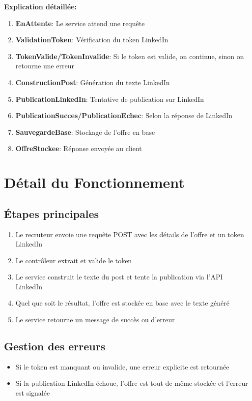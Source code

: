 \documentclass[a4paper,12pt]{report}
\begin{document}
\textbf{Explication détaillée:}
\begin{enumerate}[leftmargin=*]
    \item \textbf{EnAttente}: Le service attend une requête
    \item \textbf{ValidationToken}: Vérification du token LinkedIn
    \item \textbf{TokenValide/TokenInvalide}: Si le token est valide, on continue, sinon on retourne une erreur
    \item \textbf{ConstructionPost}: Génération du texte LinkedIn
    \item \textbf{PublicationLinkedIn}: Tentative de publication sur LinkedIn
    \item \textbf{PublicationSucces/PublicationEchec}: Selon la réponse de LinkedIn
    \item \textbf{SauvegardeBase}: Stockage de l'offre en base
    \item \textbf{OffreStockee}: Réponse envoyée au client
\end{enumerate}

\chapter{Détail du Fonctionnement}
\section{Étapes principales}
\begin{enumerate}[leftmargin=*]
    \item Le recruteur envoie une requête POST avec les détails de l'offre et un token LinkedIn
    \item Le contrôleur extrait et valide le token
    \item Le service construit le texte du post et tente la publication via l'API LinkedIn
    \item Quel que soit le résultat, l'offre est stockée en base avec le texte généré
    \item Le service retourne un message de succès ou d'erreur
\end{enumerate}

\section{Gestion des erreurs}
\begin{itemize}[leftmargin=*]
    \item Si le token est manquant ou invalide, une erreur explicite est retournée
    \item Si la publication LinkedIn échoue, l'offre est tout de même stockée et l'erreur est signalée
\end{itemize}
\end{document}
